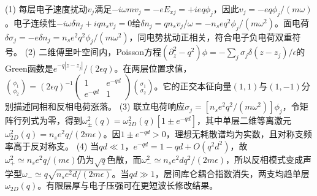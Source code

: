 (1) 每层电子速度扰动\(v_j\)满足\(-i\omega mv_j=-eE_{xj}=+ieq\phi_j\)，因此\(v_j=-eq\phi_j/(m\omega)\)。电子连续性\(-i\omega\delta n_j+iqn_sv_j=0\)给\(\delta n_j=qn_sv_j/\omega=-n_se q^2\phi_j/(m\omega^2)\)。面电荷\(\delta\sigma_j=-e\delta n_j=n_se^2q^2\phi_j/(m\omega^2)\)，同电势扰动正相关，符合电子负电荷双重符号。
(2) 二维傅里叶空间内，Poisson方程\((\partial_z^2-q^2)\phi=-\sum_j\sigma_j\delta(z-z_j)/\epsilon\)的Green函数是\(e^{-q|z-z_j|}/(2\epsilon q)\)。在两层位置求值，\(\binom{\phi_1}{\phi_2}=(2\epsilon q)^{-1}\begin{pmatrix}1&e^{-qd}\\e^{-qd}&1\end{pmatrix}\binom{\sigma_1}{\sigma_2}\)。它的正交本征向量\((1,1)\)与\((1,-1)\)分别描述同相和反相电荷涨落。
(3) 联立电荷响应\(\sigma_j=[n_se^2q^2/(m\omega^2)]\phi_j\)，令矩阵行列式为零，得到\(\omega_\pm^2(q)=\omega_{2D}^2(q)[1\pm e^{-qd}]\)，其中单层二维等离激元\(\omega_{2D}^2(q)=n_se^2q/(2m\epsilon)\)。因\(1\pm e^{-qd}>0\)，理想无耗散谱均为实数，且对称支频率高于反对称支。
(4) 当\(qd\ll1\)，\(e^{-qd}=1-qd+O(q^2d^2)\)，故\(\omega_+^2\simeq n_se^2q/(m\epsilon)\)仍为\(\sqrt q\)色散，而\(\omega_-^2\simeq n_se^2dq^2/(2m\epsilon)\)，所以反相模式变成声学型\(\omega_-\simeq q\sqrt{n_se^2d/(2m\epsilon)}\)。当\(qd\gg1\)，层间库仑耦合指数消失，两支均趋单层\(\omega_{2D}(q)\)。有限层厚与电子压强可在更短波长修改结果。
